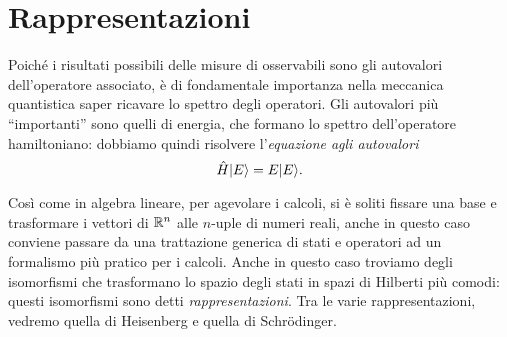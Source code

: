 \chapter{Rappresentazioni}
Poich\'e i risultati possibili delle misure di osservabili sono gli autovalori dell'operatore associato, è di fondamentale importanza nella meccanica quantistica saper ricavare lo spettro degli operatori.
Gli autovalori più ``importanti'' sono quelli di energia, che formano lo spettro dell'operatore hamiltoniano: dobbiamo quindi risolvere l'\emph{equazione agli autovalori}
\begin{equation}
	\hat{H}\lvert E\rangle=E\lvert E\rangle.
	\label{eq:equazione-autovalori-hamiltoniano}
\end{equation}

Cos\`i come in algebra lineare, per agevolare i calcoli, si è soliti fissare una base e trasformare i vettori di $\mathbb{R}^n$ alle $n$-uple di numeri reali, anche in questo caso conviene passare da una trattazione generica di stati e operatori ad un formalismo più pratico per i calcoli.
Anche in questo caso troviamo degli isomorfismi che trasformano lo spazio degli stati in spazi di Hilberti più comodi: questi isomorfismi sono detti \emph{rappresentazioni}.
Tra le varie rappresentazioni, vedremo quella di Heisenberg e quella di Schr\"odinger.

